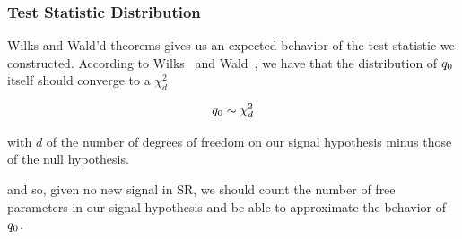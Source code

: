 \documentclass[../../ddppaper2.tex]{subfiles}
\begin{document}
\subsubsection{Test Statistic Distribution}

Wilks and Wald'd theorems gives us an expected behavior of the test statistic we constructed. According to Wilks~\cite{Wilks_Original} and Wald~\cite{Wald_Original}, we have that the distribution of ${q_{0}}$ itself should converge to a $\chi^2_d$

\begin{equation}
    {q_{0}} \sim \chi^2_{d}
\end{equation}

\noindent with $d$ of the number of degrees of freedom on our signal hypothesis minus those of the null hypothesis.

and so, given no new signal in SR, we should count the number of free parameters in our signal hypothesis and be able to approximate the behavior of ${q_{0}}$.
\end{document}
